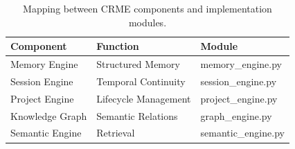 \begin{table}[t]
\caption{Mapping between CRME components and implementation modules.}
\label{tab:components}
\centering
\begin{tabular}{lll}
\hline
\textbf{Component} &
\textbf{Function} &
\textbf{Module} \\
\hline

Memory Engine &
Structured Memory &
memory\_engine.py \\

Session Engine &
Temporal Continuity &
session\_engine.py \\

Project Engine &
Lifecycle Management &
project\_engine.py \\

Knowledge Graph &
Semantic Relations &
graph\_engine.py \\

Semantic Engine &
Retrieval &
semantic\_engine.py \\

\hline
\end{tabular}
\end{table}


